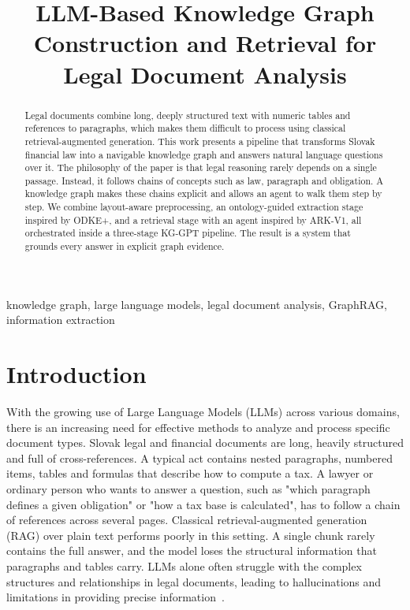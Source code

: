 \documentclass[conference]{IEEEtran}
\begin{document}
\title{LLM-Based Knowledge Graph Construction and Retrieval for Legal Document Analysis}

\author{
}

\maketitle

\begin{abstract}
Legal documents combine long, deeply structured text with numeric tables and references to paragraphs, which makes them difficult to process using classical retrieval-augmented generation. This work presents a pipeline that transforms Slovak financial law into a navigable knowledge graph and answers natural language questions over it. The philosophy of the paper is that legal reasoning rarely depends on a single passage. Instead, it follows chains of concepts such as law, paragraph and obligation. A knowledge graph makes these chains explicit and allows an agent to walk them step by step. We combine layout-aware preprocessing, an ontology-guided extraction stage inspired by ODKE+, and a retrieval stage with an agent inspired by ARK-V1, all orchestrated inside a three-stage KG-GPT pipeline. The result is a system that grounds every answer in explicit graph evidence.
\end{abstract}

\begin{IEEEkeywords}
knowledge graph, large language models, legal document analysis, GraphRAG, information extraction
\end{IEEEkeywords}

\section{Introduction}

With the growing use of Large Language Models (LLMs) across various domains, there is an increasing need for effective methods to analyze and process specific document types. Slovak legal and financial documents are long, heavily structured and full of cross-references. A typical act contains nested paragraphs, numbered items, tables and formulas that describe how to compute a tax. A lawyer or ordinary person who wants to answer a question, such as "which paragraph defines a given obligation" or "how a tax base is calculated", has to follow a chain of references across several pages. Classical retrieval-augmented generation (RAG) over plain text performs poorly in this setting. A single chunk rarely contains the full answer, and the model loses the structural information that paragraphs and tables carry. LLMs alone often struggle with the complex structures and relationships in legal documents, leading to hallucinations and limitations in providing precise information~\cite{yao2024}.
\end{document}
